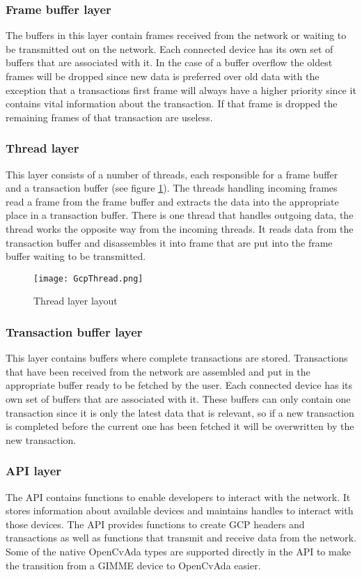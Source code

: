 \subsubsection{Frame buffer layer}
The buffers in this layer contain frames received from the network or waiting to be transmitted out on the network. Each connected device has its own set of buffers that are associated with it. In the case of a buffer overflow the oldest frames will be dropped since new data is preferred over old data with the exception that a transactions first frame will always have a higher priority since it contains vital information about the transaction. If that frame is dropped the remaining frames of that transaction are useless.
\subsubsection{Thread layer}
This layer consists of a number of threads, each responsible for a frame buffer and a transaction buffer (see figure \ref{fig:GcpThread}). The threads handling incoming frames read a frame from the frame buffer and extracts the data into the appropriate place in a transaction buffer. There is one thread that handles outgoing data, the thread works the opposite way from the incoming threads. It reads data from the transaction buffer and disassembles it into frame that are put into the frame buffer waiting to be transmitted.

\begin{figure}
\centering
\texttt{[image: GcpThread.png]}
\caption{Thread layer layout}
\label{fig:GcpThread}
\end{figure}
\subsubsection{Transaction buffer layer}
This layer contains buffers where complete transactions are stored. Transactions that have been received from the network are assembled and put in the appropriate buffer ready to be fetched by the user. Each connected device has its own set of buffers that are associated with it. These buffers can only contain one transaction since it is only the latest data that is relevant, so if a new transaction is completed before the current one has been fetched it will be overwritten by the new transaction.
\subsubsection{API layer}
The API contains functions to enable developers to interact with the network. It stores information about available devices and maintains handles to interact with those devices. The API provides functions to create GCP headers and transactions as well as functions that transmit and receive data from the network. Some of the native OpenCvAda types are supported directly in the API to make the transition from a GIMME device to OpenCvAda easier.